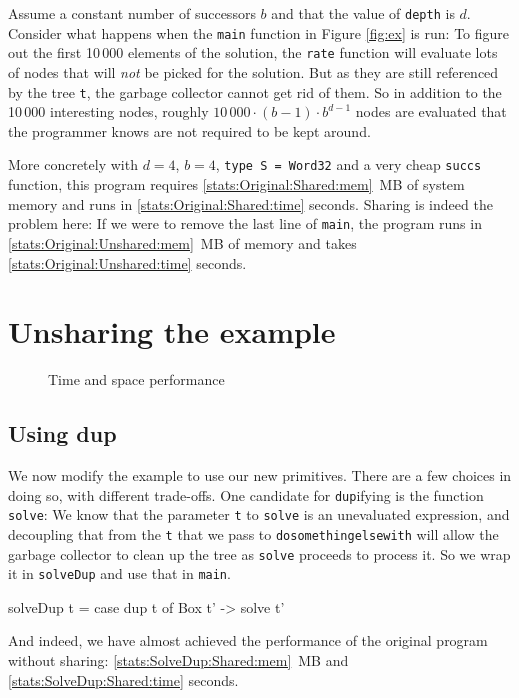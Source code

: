 \documentclass[preprint]{sigplanconf}
\theoremstyle{nonumberplain}
\newcommand{\li}{\lstinline[style=Haskell]}
\begin{document}
Assume a constant number of successors $b$ and that the value of \li-depth- is $d$. Consider what happens when the \li-main- function in Figure \ref{fig:ex} is run: To figure out the first 10\,000 elements of the solution, the \li-rate- function will evaluate lots of nodes that will \emph{not} be picked for the solution. But as they are still referenced by the tree \li-t-, the garbage collector cannot get rid of them. So in addition to the  10\,000 interesting nodes, roughly $10\,000\cdot (b-1)\cdot b^{d-1}$ nodes are evaluated that the programmer knows are not required to be kept around.

More concretely with $d=4$, $b=4$, \li-type S = Word32- and a very cheap \li-succs- function, this program requires \ref{stats:Original:Shared:mem}~MB of system memory and runs in \ref{stats:Original:Shared:time} seconds. Sharing is indeed the problem here: If we were to remove the last line of \li-main-, the program runs in \ref{stats:Original:Unshared:mem}~MB of memory and takes \ref{stats:Original:Unshared:time} seconds.

\section{Unsharing the example}
\label{sec:unsharing}

\begin{figure*}
\centering

\caption{Time and space performance}
\label{fig:stats}
\end{figure*}

\subsection{Using dup}

We now modify the example to use our new primitives. There are a few choices in doing so, with different trade-offs. One candidate for \li-dup-ifying is the function \li-solve-: We know that the parameter \li-t- to \li-solve- is an unevaluated expression, and decoupling that from the \li-t- that we pass to \li-dosomethingelsewith- will allow the garbage collector to clean up the tree as \li-solve- proceeds to process it. So we wrap it in \li-solveDup- and use that in \li-main-.
\begin{haskell}
solveDup t = case dup t of Box t' -> solve t'
\end{haskell}
And indeed, we have almost achieved the performance of the original program without sharing: \ref{stats:SolveDup:Shared:mem}~MB and \ref{stats:SolveDup:Shared:time} seconds.
\end{document}
